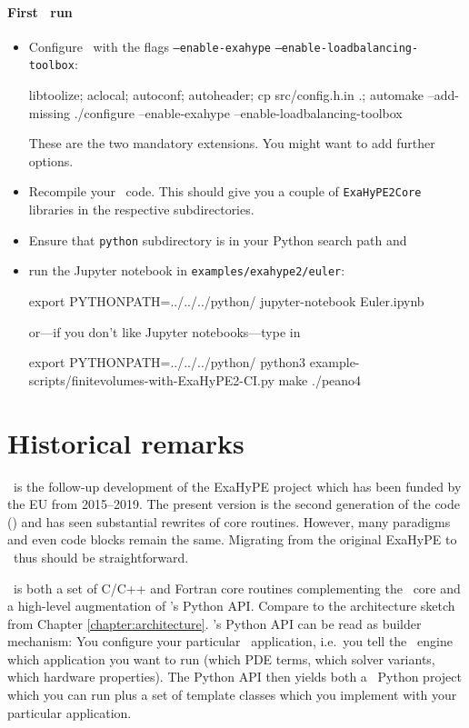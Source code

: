 \begin{framed}
\paragraph*{First \ExaHyPE\ run}
\begin{itemize}
  \item Configure \Peano\ with the flags \texttt{--enable-exahype}
  \texttt{--enable-loadbalancing-toolbox}:
  \begin{code}
libtoolize; aclocal; autoconf; autoheader; cp src/config.h.in .; automake --add-missing
./configure --enable-exahype --enable-loadbalancing-toolbox
  \end{code}
   These are the two mandatory extensions. You might want to add further options.
  \item Recompile your \Peano\ code. This should give you a couple of
  \texttt{ExaHyPE2Core} libraries in the respective subdirectories.
  \item Ensure that \texttt{python} subdirectory is in your Python search path
  and
  \item run the Jupyter notebook in \texttt{examples/exahype2/euler}: 
  \begin{code}
export PYTHONPATH=../../../python/
jupyter-notebook Euler.ipynb
  \end{code}
  \noindent
  or---if you don't like Jupyter notebooks---type in
  \begin{code}
export PYTHONPATH=../../../python/
python3 example-scripts/finitevolumes-with-ExaHyPE2-CI.py
make
./peano4
  \end{code}
\end{itemize}
\end{framed}



\section{Historical remarks}

\ExaHyPE\ is the follow-up development of the ExaHyPE project which has
been funded by the EU from 2015--2019.
The present version is the second generation of the code (\ExaHyPE) and has
seen substantial rewrites of core routines.
However, many paradigms and even code blocks remain the same.
Migrating from the original ExaHyPE to \ExaHyPE\ thus should be straightforward.


\ExaHyPE\ is both a set of C/C++ and Fortran core routines complementing the
\Peano\ core and a high-level augmentation of \Peano's Python API.
Compare to the architecture sketch from Chapter \ref{chapter:architecture}.
\ExaHyPE's Python API can be read as builder mechanism:
You configure your particular \ExaHyPE\ application, i.e.~you tell the \ExaHyPE\
engine which application you want to run (which PDE terms, which solver
variants, which hardware properties).
The Python API then yields both a \Peano\ Python project which you can run plus
a set of template classes which you implement with your particular application.



